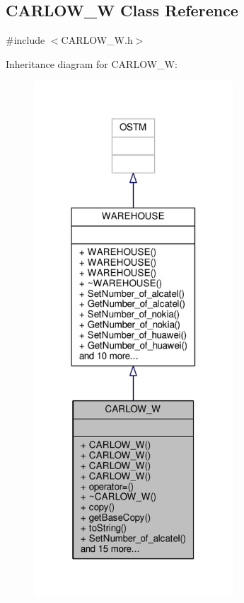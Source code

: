 \hypertarget{class_c_a_r_l_o_w___w}{}\subsection{C\+A\+R\+L\+O\+W\+\_\+W Class Reference}
\label{class_c_a_r_l_o_w___w}


{\ttfamily \#include $<$C\+A\+R\+L\+O\+W\+\_\+\+W.\+h$>$}



Inheritance diagram for C\+A\+R\+L\+O\+W\+\_\+W\+:
\nopagebreak
\begin{figure}[H]
\begin{center}
\leavevmode
\includegraphics[width=211pt]{class_c_a_r_l_o_w___w__inherit__graph}
\end{center}
\end{figure}


